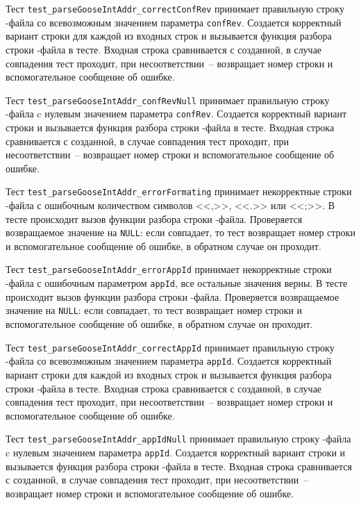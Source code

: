 Тест \lstinline{test_parseGooseIntAddr_correctConfRev} принимает правильную строку \cid-файла со всевозможным значением параметра \lstinline{confRev}. Создается корректный вариант строки для каждой из входных строк и вызывается функция разбора строки \cid-файла в тесте. Входная строка сравнивается с созданной, в случае совпадения тест проходит, при несоответствии~-- возвращает номер строки и вспомогательное сообщение  об ошибке.

Тест \lstinline{test_parseGooseIntAddr_confRevNull} принимает правильную строку \cid-файла c нулевым значением параметра \lstinline{confRev}. Создается корректный вариант строки и вызывается функция разбора строки \cid-файла в тесте. Входная строка сравнивается с созданной, в случае совпадения тест проходит, при несоответствии~-- возвращает номер строки и вспомогательное сообщение об ошибке.

Тест \lstinline{test_parseGooseIntAddr_errorFormating} принимает некорректные строки \cid-файла с ошибочным количеством символов <<,>>, <<.>> или <<;>>. В тесте происходит вызов функции разбора строки \cid-файла. Проверяется возвращаемое значение на \lstinline{NULL}: если совпадает, то тест возвращает номер строки и вспомогательное сообщение об ошибке, в обратном случае он проходит.

Тест \lstinline{test_parseGooseIntAddr_errorAppId} принимает некорректные строки \cid-файла с ошибочным параметром \lstinline{appId}, все остальные значения верны. В тесте происходит вызов функции разбора строки \cid-файла. Проверяется возвращаемое значение на \lstinline{NULL}: если совпадает, то тест возвращает номер строки и вспомогательное сообщение об ошибке, в обратном случае он проходит.

Тест \lstinline{test_parseGooseIntAddr_correctAppId} принимает правильную строку \cid-файла со всевозможным значением параметра \lstinline{appId}. Создается корректный вариант строки для каждой из входных строк и вызывается функция разбора строки \cid-файла в тесте. Входная строка сравнивается с созданной, в случае совпадения тест проходит, при несоответствии~-- возвращает номер строки и вспомогательное сообщение об ошибке.

Тест \lstinline{test_parseGooseIntAddr_appIdNull} принимает правильную строку \cid-файла c нулевым значением параметра \lstinline{appId}. Создается корректный вариант строки и вызывается функция разбора строки \cid-файла в тесте. Входная строка сравнивается с созданной, в случае совпадения тест проходит, при несоответствии~-- возвращает номер строки и вспомогательное сообщение об ошибке.

